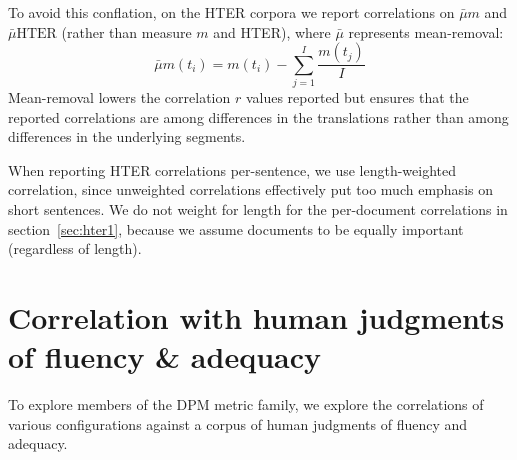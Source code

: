 \documentclass{kluwer}    %
\begin{document}
\begin{article}
To avoid this conflation, on the HTER corpora we report correlations
on $\bar{\mu}m$ and $\bar{\mu}\textrm{HTER}$ (rather than measure
$m$ and HTER), where $\bar{\mu}$ represents mean-removal:
\begin{equation}
  \label{eq:meansub}
  \bar{\mu}m(t_i) = m(t_i) - \sum_{j=1}^I\frac{m(t_j)}{I}
\end{equation}
Mean-removal lowers the correlation $r$ values reported but ensures
that the reported correlations are among differences in the
translations rather than among differences in the underlying segments.

When reporting HTER correlations per-sentence, we use length-weighted
correlation, since unweighted correlations effectively put too much
emphasis on short sentences.  We do not weight for length for the
per-document correlations in section~\ref{sec:hter1}, because we
assume documents to be equally important (regardless of length).

\section{Correlation with human judgments of fluency \& adequacy}
\label{sec:faexpts}

To explore members of the DPM metric family, we explore the
correlations of various configurations against a corpus of human
judgments of fluency and adequacy.


\end{article}
\end{document}
